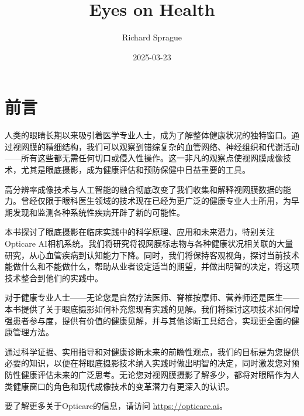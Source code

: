 \documentclass[
  Letterpaper,
]{scrbook}
\title{Eyes on Health}
\author{Richard Sprague}
\date{2025-03-23}
\renewcommand*\contentsname{目录}
\newcommand\contentsname{目录}
\begin{document}
\frontmatter
\maketitle

\renewcommand*\contentsname{目录}
{
\setcounter{tocdepth}{1}
\tableofcontents
}

\mainmatter
{}

\chapter*{前言}\label{ux524dux8a00}


人类的眼睛长期以来吸引着医学专业人士，成为了解整体健康状况的独特窗口。通过视网膜的精细结构，我们可以观察到错综复杂的血管网络、神经组织和代谢活动------所有这些都无需任何切口或侵入性操作。这一非凡的观察点使视网膜成像技术，尤其是眼底摄影，成为健康评估和预防保健中日益重要的工具。

高分辨率成像技术与人工智能的融合彻底改变了我们收集和解释视网膜数据的能力。曾经仅限于眼科医生领域的技术现在已经为更广泛的健康专业人士所用，为早期发现和监测各种系统性疾病开辟了新的可能性。

本书探讨了眼底摄影在临床实践中的科学原理、应用和未来潜力，特别关注Opticare
AI相机系统。我们将研究将视网膜标志物与各种健康状况相关联的大量研究，从心血管疾病到认知能力下降。同时，我们将保持客观视角，探讨当前技术能做什么和不能做什么，帮助从业者设定适当的期望，并做出明智的决定，将这项技术整合到他们的实践中。

对于健康专业人士------无论您是自然疗法医师、脊椎按摩师、营养师还是医生------本书提供了关于眼底摄影如何补充您现有实践的见解。我们将探讨这项技术如何增强患者参与度，提供有价值的健康见解，并与其他诊断工具结合，实现更全面的健康管理方法。

通过科学证据、实用指导和对健康诊断未来的前瞻性观点，我们的目标是为您提供必要的知识，以便在将眼底摄影技术纳入实践时做出明智的决定，同时激发您对预防性健康评估未来的广泛思考。无论您对视网膜摄影了解多少，都将对眼睛作为人类健康窗口的角色和现代成像技术的变革潜力有更深入的认识。

要了解更多关于Opticare的信息，请访问 \url{https://opticare.ai}。

\pagebreak
\end{document}
